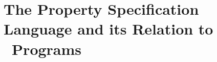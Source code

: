 \section{The Property Specification Language and its Relation to \gwendolen\ Programs}

{
  \let\section\subsection
  \let\subsection\subsubsection
  \let\subsubsection\paragraph
  
  
  }
